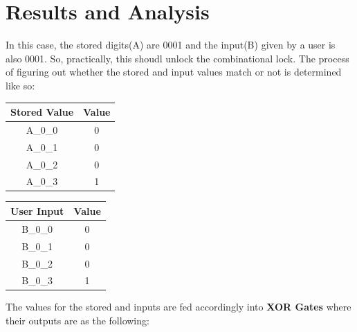 \documentclass{article}
\begin{document}
\newpage
\section{Results and Analysis}

In this case, the stored digits(A) are 0001 and the input(B) given by a user
is also 0001. So, practically, this shoudl unlock the combinational lock. The process of figuring out whether
the stored and input values match or not is determined like so:

\vspace{1cm}

\begin{minipage}[t]{0.4\linewidth}
    \begin{center}
    \begin{tabular}{ |c|c| }
        \hline
        {\bf Stored Value} & {\bf Value}\\
        \hline
        A\_0\_0 & 0 \\
        \hline
        A\_0\_1 & 0 \\
        \hline
        A\_0\_2 & 0 \\
        \hline
        A\_0\_3 & 1 \\
        \hline
    \end{tabular}
    \end{center}
\end{minipage}\hfill
\begin{minipage}[t]{0.6\linewidth}
    \begin{center}
    \begin{tabular}{ |c|c| }
        \hline
        {\bf User Input} & {\bf Value}\\
        \hline
        B\_0\_0 & 0 \\
        \hline
        B\_0\_1 & 0 \\
        \hline
        B\_0\_2 & 0 \\
        \hline
        B\_0\_3 & 1 \\
        \hline
    \end{tabular}
    \end{center}
\end{minipage}

\vspace{1cm}

The values for the stored and inputs are fed accordingly into {\bf XOR Gates}
where their outputs are as the following:

\vspace{1cm}
\end{document}
